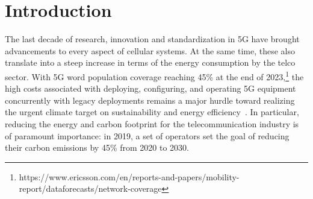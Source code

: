 \section{Introduction}



The last decade of research, innovation and standardization in 5G have brought advancements to every aspect of cellular systems. 
At the same time, these also translate into a steep increase in terms of the energy consumption by the telco sector. 
With 5G word population coverage reaching 45\% at the end of 2023,\footnote{https://www.ericsson.com/en/reports-and-papers/mobility-report/dataforecasts/network-coverage} the high costs associated with deploying, configuring, and operating 5G equipment concurrently with legacy deployments remains a major hurdle toward realizing the urgent climate target on sustainability and energy efficiency~\cite{huawei_report}.
In particular, reducing the energy and carbon footprint for the telecommunication industry is of paramount importance:
in 2019, a set of operators set the goal of reducing their carbon emissions by 45\% from 2020 to 2030\cite{gsma20205g}.

